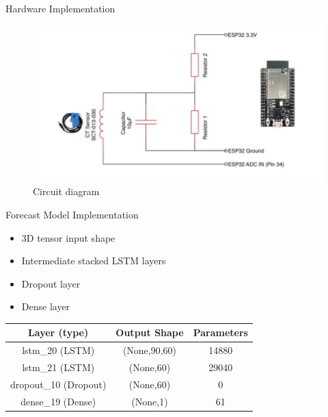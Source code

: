 \documentclass[11pt, aspect ratio=169]{beamer}
\begin{document}
\begin{frame}{Hardware Implementation }
\begin{center}
\begin{large}
\end{large}
\end{center}
\begin{figure}[h!]
\centering
\includegraphics[width=10cm=\textwidth]{images/circuitf.JPG}
\caption{Circuit diagram}
\end{figure}
\end{frame}

\begin{frame}{Forecast Model Implementation}
\begin{itemize}
    \item 3D tensor input shape
    \item Intermediate stacked LSTM layers 
    \item Dropout layer
    \item Dense layer
\end{itemize}

 \begin{table}[]
\centering
  \begin{tabular}{||c|c|c||}
  \hline
     \textbf{Layer (type)}  &  \textbf{Output Shape} & \textbf{Parameters}\\ [0.5ex]
  \hline\hline   
     lstm\_20 (LSTM)  &  (None,90,60) & 14880\\
  \hline   
     lstm\_21 (LSTM)  &  (None,60) & 29040\\
  \hline 
     dropout\_10 (Dropout) & (None,60) & 0\\
  \hline
     dense\_19 (Dense) & (None,1) & 61\\ [1ex]
\hline
  \end{tabular}
  \end{table}

\end{frame}
\end{document}
